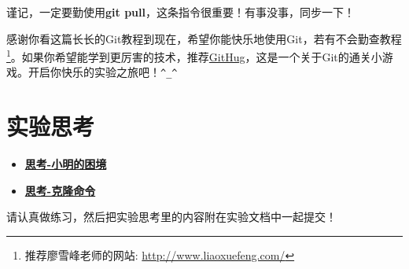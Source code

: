 谨记，一定要勤使用\textbf{git pull}，这条指令很重要！有事没事，同步一下！

感谢你看这篇长长的Git教程到现在，希望你能快乐地使用Git，若有不会勤查教程\footnote{推荐廖雪峰老师的网站:
\url{http://www.liaoxuefeng.com/}}。如果你希望能学到更厉害的技术，推荐\href{https://github.com/Gazler/githug}{GitHug}，这是一个关于Git的通关小游戏。开启你快乐的实验之旅吧！\verb|^_^|

\section{实验思考}
\begin{itemize}
\item \hyperref[think-小明的困境]{\textbf{\textcolor{baseB}{思考-小明的困境}}}
\item \hyperref[think-克隆]{\textbf{\textcolor{baseB}{思考-克隆命令}}}
\end{itemize}

请认真做练习，然后把实验思考里的内容附在实验文档中一起提交！